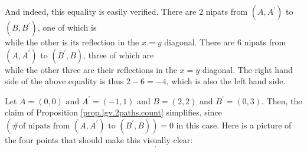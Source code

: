 \begin{definition}
\begin{example}
And indeed, this equality is easily verified. There are $2$ nipats from
$\left(  A,A^{\prime}\right)  $ to $\left(  B,B^{\prime}\right)  $, one of
which is
\[%
\]
while the other is its reflection in the $x=y$ diagonal. There are $6$ nipats
from $\left(  A,A^{\prime}\right)  $ to $\left(  B^{\prime},B\right)  $, three
of which are
\[%
\ \ \ \ \ \ \ \ \ \
\ \ \ \ \ \ \ \ \ \
\]
while the other three are their reflections in the $x=y$ diagonal. The right
hand side of the above equality is thus $2-6=-4$, which is also the left hand side.
\end{example}

\begin{example}
\label{exa.lgv.2paths.2}Let $A=\left(  0,0\right)  $ and $A^{\prime}=\left(
-1,1\right)  $ and $B=\left(  2,2\right)  $ and $B^{\prime}=\left(
0,3\right)  $. Then, the claim of Proposition \ref{prop.lgv.2paths.count}
simplifies, since $\left(  \text{\# of nipats from }\left(  A,A^{\prime
}\right)  \text{ to }\left(  B^{\prime},B\right)  \right)  =0$ in this case.
Here is a picture of the four points that should make this visually clear:
\[%
\ \ .
\]

\end{example}


\end{definition}
